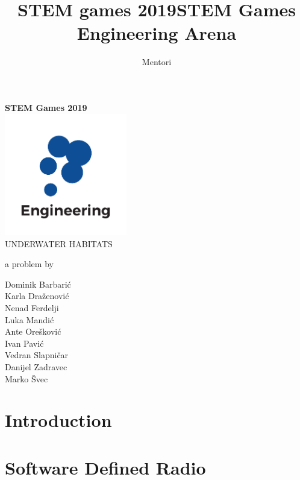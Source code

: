 \documentclass{article}
\title{STEM games 2019}
\author{Mentori}
\title{STEM Games Engineering Arena}
\date{}
\begin{document}
	
	\thispagestyle{empty}
	\newpage
	\thispagestyle{empty}
	\vspace*{0cm}
	\begin{center}
		
		\textbf{\Huge{STEM Games 2019}}\\
		\vspace*{2.4cm}
		\includegraphics[width=0.4\textwidth]{logos/engineering} \\
		\vspace*{2.4cm}
		\huge{UNDERWATER HABITATS}
		
		\medskip
		
		\normalsize{a problem by}
		
		\medskip
		
		Dominik Barbarić \\
		Karla Draženović \\
		Nenad Ferdelji \\
		Luka Mandić \\
		Ante Orešković \\
		Ivan Pavić \\
		Vedran Slapničar \\
		Danijel Zadravec \\
		Marko Švec 
		
		\vspace{6cm}
		
		
		\normalsize{}
	\end{center}
	
	\newpage
	
	\section{Introduction}
	
	
	\section{Software Defined Radio}
\end{document}
